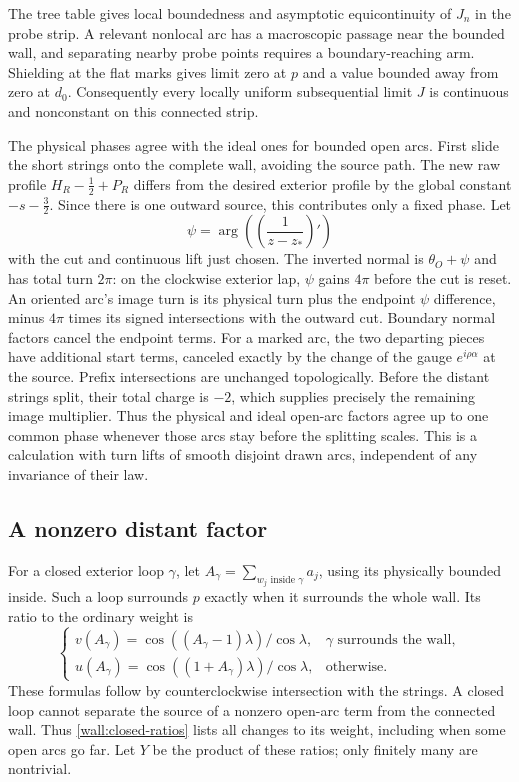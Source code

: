 The tree table gives local boundedness and asymptotic equicontinuity of
$J_n$ in the probe strip.  A relevant nonlocal arc has a macroscopic
passage near the bounded wall, and separating nearby probe points
requires a boundary-reaching arm.  Shielding at the flat marks gives
limit zero at $p$ and a value bounded away from zero at $d_0$.
Consequently every locally uniform subsequential limit $J$ is continuous
and nonconstant on this connected strip.

The physical phases agree with the ideal ones for bounded open arcs.
First slide the short strings onto the complete wall, avoiding the
source path.  The new raw profile $H_R-\tfrac12+P_R$ differs from the
desired exterior profile by the global constant $-s-\tfrac32$.
Since there is one outward source, this contributes only a fixed phase.
Let
\begin{equation}
 \psi=\arg\left(\left(\frac1{z-z_*}\right)'\right)
 \label{wall:inversion-angle}
\end{equation}
with the cut and continuous lift just chosen.  The inverted normal is
$\theta_O+\psi$ and has total turn $2\pi$: on the clockwise exterior
lap, $\psi$ gains $4\pi$ before the cut is reset.  An oriented arc's
image turn is its physical turn plus the endpoint $\psi$ difference,
minus $4\pi$ times its signed intersections with the outward cut.
Boundary normal factors cancel the endpoint terms.  For a marked arc,
the two departing pieces have additional start terms, canceled exactly
by the change of the gauge $e^{i\rho\alpha}$ at the source.
Prefix intersections are unchanged topologically.  Before the distant
strings split, their total charge is $-2$, which supplies precisely the
remaining image multiplier.  Thus the physical and ideal open-arc
factors agree up to one common phase whenever those arcs stay before
the splitting scales.  This is a calculation with turn lifts of smooth
disjoint drawn arcs, independent of any invariance of their law.

\subsection{A nonzero distant factor}

For a closed exterior loop $\gamma$, let
$A_\gamma=\sum_{w_j\text{ inside }\gamma}a_j$, using its physically
bounded inside.  Such a loop surrounds $p$ exactly when it surrounds
the whole wall.  Its ratio to the ordinary weight is
\begin{equation}
 \begin{cases}
 v(A_\gamma)=\cos((A_\gamma-1)\lambda)/\cos\lambda,
       &\gamma\text{ surrounds the wall},\\
 u(A_\gamma)=\cos((1+A_\gamma)\lambda)/\cos\lambda,
       &\text{otherwise}.
 \end{cases}
 \label{wall:closed-ratios}
\end{equation}
These formulas follow by counterclockwise intersection with the strings.
A closed loop cannot separate the source of a nonzero open-arc term
from the connected wall.  Thus \eqref{wall:closed-ratios} lists all
changes to its weight, including when some open arcs go far.
Let $Y$ be the product of these ratios; only finitely many are nontrivial.

